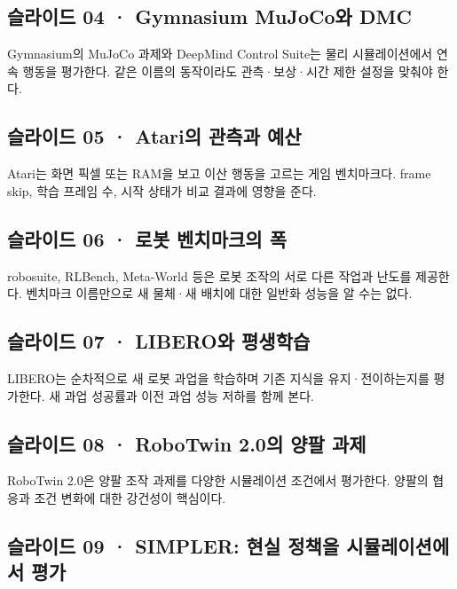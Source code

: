 \documentclass[11pt,a4paper]{article}
\begin{document}
\subsection{슬라이드 04 · Gymnasium MuJoCo와 DMC}

Gymnasium의 MuJoCo 과제와 DeepMind Control Suite는 물리 시뮬레이션에서 연속 행동을 평가한다. 같은 이름의 동작이라도 관측·보상·시간 제한 설정을 맞춰야 한다.\par

\subsection{슬라이드 05 · Atari의 관측과 예산}

Atari는 화면 픽셀 또는 RAM을 보고 이산 행동을 고르는 게임 벤치마크다. frame skip, 학습 프레임 수, 시작 상태가 비교 결과에 영향을 준다.\par

\subsection{슬라이드 06 · 로봇 벤치마크의 폭}

robosuite, RLBench, Meta-World 등은 로봇 조작의 서로 다른 작업과 난도를 제공한다. 벤치마크 이름만으로 새 물체·새 배치에 대한 일반화 성능을 알 수는 없다.\par

\subsection{슬라이드 07 · LIBERO와 평생학습}

LIBERO는 순차적으로 새 로봇 과업을 학습하며 기존 지식을 유지·전이하는지를 평가한다. 새 과업 성공률과 이전 과업 성능 저하를 함께 본다.\par

\subsection{슬라이드 08 · RoboTwin 2.0의 양팔 과제}

RoboTwin 2.0은 양팔 조작 과제를 다양한 시뮬레이션 조건에서 평가한다. 양팔의 협응과 조건 변화에 대한 강건성이 핵심이다.\par

\subsection{슬라이드 09 · SIMPLER: 현실 정책을 시뮬레이션에서 평가}
\end{document}
